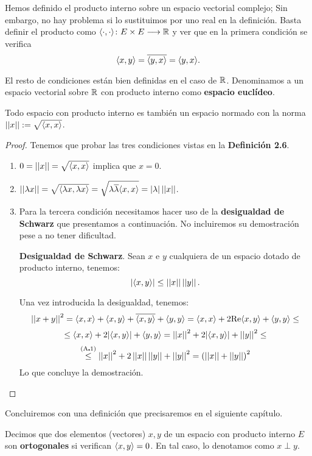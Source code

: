 \begin{observation} Hemos definido el producto interno sobre un espacio vectorial complejo; Sin embargo, no hay problema si lo sustituimos por uno real en la definición. Basta definir el producto como $\langle\cdot,\cdot\rangle\colon E\times E\longrightarrow \mathbb{R}$ y ver que en la primera condición se verifica
\[\langle x,y\rangle=\overline{\langle y,x\rangle}=\langle y,x\rangle.\]

El resto de condiciones están bien definidas en el caso de $\mathbb{R}$. Denominamos a un espacio vectorial sobre $\mathbb{R}$ con producto interno como \textbf{espacio euclídeo}.
\end{observation}

\begin{proposition} Todo espacio con producto interno es también un espacio normado con la norma $\left|\left|x\right|\right|:=\sqrt{\langle x,x\rangle}$.
\begin{proof} Tenemos que probar las tres condiciones vistas en la \textbf{Definición 2.6}.
\begin{enumerate}[label=\alph*)]
\item $0 = \left|\left|x\right|\right| = \sqrt{\langle x,x\rangle}$ implica que $x=0$.
\item $\left|\left|\lambda x\right|\right| = \sqrt{\langle\lambda x,\lambda x\rangle} = \sqrt{\lambda\overline{\lambda}\langle x,x\rangle}=|\lambda|\left|\left|x\right|\right|$.
\item Para la tercera condición necesitamos hacer uso de la \textbf{desigualdad de Schwarz} que presentamos a continuación. No incluiremos su demostración pese a no tener dificultad.

\begin{thm} \textbf{Desigualdad de Schwarz}. Sean $x$ e $y$ cualquiera de un espacio dotado de producto interno, tenemos:
\begin{equation}
|\langle x,y\rangle|\leq\left|\left|x\right|\right|\left|\left|y\right|\right|.
\end{equation}
\end{thm}
Una vez introducida la desigualdad, tenemos:
\[\left|\left|x+y\right|\right|^2 = \langle x,x\rangle + \langle x,y\rangle + \overline{\langle x,y\rangle} + \langle y,y\rangle = \langle x,x\rangle + 2\mathrm{Re}\langle x,y\rangle + \langle y,y\rangle \leq\]
\[\leq \langle x,x\rangle + 2|\langle x,y\rangle| + \langle y,y\rangle = \left|\left|x\right|\right|^2+ 2|\langle x,y\rangle|+\left|\left|y\right|\right|^2\leq\]
\[\overset{\mathrm{(A\centerdot1)}}{\leq}\left|\left|x\right|\right|^2+ 2\left|\left|x\right|\right|\left|\left|y\right|\right|+\left|\left|y\right|\right|^2 = \left(\left|\left|x\right|\right|+\left|\left|y\right|\right|\right)^2\]
Lo que concluye la demostración.
\end{enumerate}
\end{proof}
\end{proposition}

Concluiremos con una definición que precisaremos en el siguiente capítulo.

\begin{definition} Decimos que dos elementos (vectores) $x,y$ de un espacio con producto interno $E$ son \textbf{ortogonales} si verifican $\langle x,y\rangle=0$. En tal caso, lo denotamos como $x\perp y$.
\end{definition}